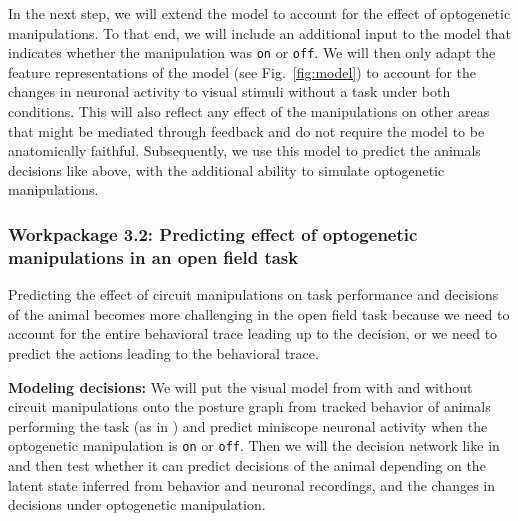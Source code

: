 \documentclass[B2,COG]{ercgrant}
\begin{document}
In the next step, we will extend the model to account for the effect of optogenetic manipulations. 
To that end, we will include an additional input to the model that indicates whether the manipulation was \texttt{on} or \texttt{off}. 
We will then only adapt the feature representations of the model (see Fig.~\ref{fig:model}) to account for the changes in neuronal activity to visual stimuli without a task under both conditions.
This will also reflect any effect of the manipulations on other areas that might be mediated through feedback and do not require the model to be anatomically faithful. 
Subsequently, we use this model to predict the animals decisions like above, with the additional ability to simulate optogenetic manipulations.

\subsubsection{Workpackage 3.2: Predicting effect of optogenetic manipulations in an open field task\hfill{}}

Predicting the effect of circuit manipulations on task performance and decisions of the animal becomes more challenging in the open field task because we need to account for the entire behavioral trace leading up to the decision, or we need to predict the actions leading to the behavioral trace.

\textbf{Modeling decisions:} 
We will put the visual model from  with and without circuit manipulations onto the posture graph from tracked behavior of animals performing the task (as in ) and predict miniscope neuronal activity when the optogenetic manipulation is \texttt{on} or \texttt{off}. 
Then we will the decision network like in  and then test whether it can predict decisions of the animal depending on the latent state inferred from behavior and neuronal recordings, and the changes in decisions under optogenetic manipulation. 
\end{document}
